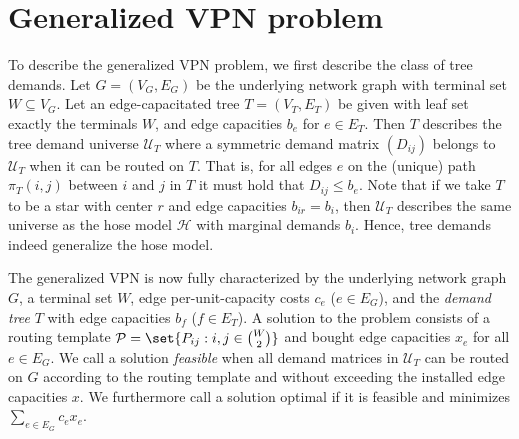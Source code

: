 \section{Generalized VPN problem}
To describe the generalized VPN problem, we first describe the class of tree demands.
Let $G = (V_G, E_G)$ be the underlying network graph with terminal set $W \subseteq V_G$.
Let an edge-capacitated tree $T = (V_T, E_T)$ be given with leaf set exactly the terminals $W$, and edge capacities $b_e$ for $e \in E_T$.
Then $T$ describes the tree demand universe $\mathcal U_T$ where a symmetric demand matrix $(D_{ij})$ belongs to $\mathcal U_T$ when it can be routed on $T$.
That is, for all edges $e$ on the (unique) path $\pi_T(i,j)$ between $i$ and $j$ in $T$ it must hold that $D_{ij} \le b_e$.
Note that if we take $T$ to be a star with center $r$ and edge capacities $b_{ir} = b_i$, then $\mathcal U_T$ describes the same universe as the hose model $\mathcal H$ with marginal demands $b_i$.
Hence, tree demands indeed generalize the hose model.

The generalized VPN is now fully characterized by the underlying network graph $G$, a terminal set $W$, edge per-unit-capacity costs $c_e$ ($e \in E_G$), and the \emph{demand tree} $T$ with edge capacities $b_f$ ($f \in E_T$).
A solution to the problem consists of a routing template $\mathcal P = \set{P_{ij} : i,j \in \binom W 2}$ and bought edge capacities $x_e$ for all $e \in E_G$.
We call a solution \emph{feasible} when all demand matrices in $\mathcal U_T$ can be routed on $G$ according to the routing template and without exceeding the installed edge capacities $x$.
We furthermore call a solution optimal if it is feasible and minimizes $\sum_{e \in E_G} c_e x_e$.

